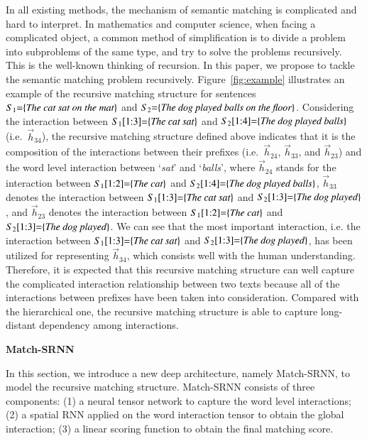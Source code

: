 In all existing methods, the mechanism of semantic matching is complicated and hard to interpret.
In mathematics and computer science, when facing a complicated object, a common method of simplification is to divide a problem into subproblems of the same type, and try to solve the problems recursively. This is the well-known thinking of recursion. In this paper, we propose to tackle the semantic matching problem recursively. 
Figure~\ref{fig:example} illustrates an example of the recursive matching structure for sentences ${S_1{=}\{\text{\em The cat sat on the mat}\}}$ and ${S_2{=}\{\text{\em The dog played balls on the floor}\}}$. Considering the interaction between ${S_1[1{:}3]{=}\{\text{\em The cat sat}\}}$ and ${S_2[1{:}4]{=}\{\text{\em The dog played balls}\}}$ (i.e.~$\vec{h}_{34}$), the recursive matching structure defined above indicates that it is the composition of the interactions between their prefixes (i.e.~$\vec{h}_{24}$, $\vec{h}_{33}$, and $\vec{h}_{23}$) and the word level interaction between `{\em sat}' and `{\em balls}', where $\vec{h}_{24}$ stands for the interaction between $S_1[1{:}2]{=}\{\text{\em The cat}\}$ and $S_2[1{:}4]{=}\{\text{\em The dog played balls}\}$, $\vec{h}_{33}$ denotes the interaction between ${S_1[1{:}3]{=}\{\text{\em The cat sat}\}}$ and ${S_2[1{:}3]{=}\{\text{\em The dog played}\}}$, and $\vec{h}_{23}$ denotes the interaction between ${S_1[1{:}2]{=}\{\text{\em The cat}\}}$ and ${S_2[1{:}3]{=}\{\text{\em The dog played}\}}$.
We can see that the most important interaction, i.e. the interaction between $S_1[1{:}3]{=}\{\text{\em The cat sat}\}$ and $S_2[1{:}3]{=}\{\text{\em The dog played}\}$, has been utilized for representing $\vec{h}_{34}$, which consists well with the human understanding.
Therefore, it is expected that this recursive matching structure can well capture the complicated interaction relationship between two texts because all of the interactions between prefixes have been taken into consideration.
Compared with the hierarchical one, the recursive matching structure is able to capture long-distant dependency among interactions.

\textbf{Match-SRNN}

In this section, we introduce a new deep architecture, namely Match-SRNN, to model the recursive matching structure. Match-SRNN consists of three components:
(1) a neural tensor network to capture the word level interactions; (2) a spatial RNN applied on the word interaction tensor to obtain the global interaction; (3) a linear scoring function to obtain the final matching score.

